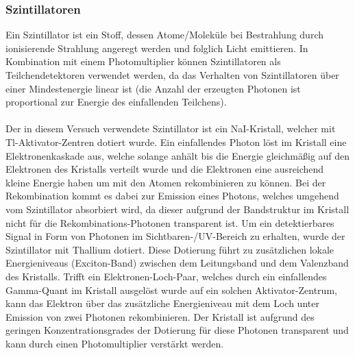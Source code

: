 \documentclass[11pt, a4paper]{article}
\numberwithin{equation}{section}
\begin{document}
\subsubsection{Szintillatoren}
Ein Szintillator ist ein Stoff, dessen Atome/Moleküle bei Bestrahlung durch ionisierende Strahlung angeregt werden und folglich Licht emittieren.
In Kombination mit einem Photomultiplier können Szintillatoren als Teilchendetektoren verwendet werden, da das Verhalten von Szintillatoren über einer Mindestenergie linear ist (die Anzahl der erzeugten Photonen ist proportional zur Energie des einfallenden Teilchens).\\
\\
Der in diesem Versuch verwendete Szintillator ist ein NaI-Kristall, welcher mit Tl-Aktivator-Zentren dotiert wurde.
Ein einfallendes Photon löst im Kristall eine Elektronenkaskade aus, welche solange anhält bis die Energie gleichmäßig auf den Elektronen des Kristalls verteilt wurde und die Elektronen eine ausreichend kleine Energie haben um mit den Atomen rekombinieren zu können.
Bei der Rekombination kommt es dabei zur Emission eines Photons, welches umgehend vom Szintillator absorbiert wird, da dieser aufgrund der Bandstruktur im Kristall nicht für die Rekombinations-Photonen transparent ist.
Um ein detektierbares Signal in Form von Photonen im Sichtbaren-/UV-Bereich zu erhalten, wurde der Szintillator mit Thallium dotiert.
Diese Dotierung führt zu zusätzlichen lokale Energieniveaus (Exciton-Band) zwischen dem Leitungsband und dem Valenzband des Kristalls.
Trifft ein Elektronen-Loch-Paar, welches durch ein einfallendes Gamma-Quant im Kristall ausgelöst wurde auf ein solchen Aktivator-Zentrum, kann das Elektron über das zusätzliche Energieniveau mit dem Loch unter Emission von zwei Photonen rekombinieren.
Der Kristall ist aufgrund des geringen Konzentrationsgrades der Dotierung für diese Photonen transparent und kann durch einen Photomultiplier verstärkt werden.
\end{document}

